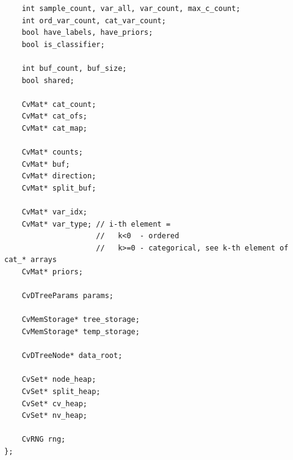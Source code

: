\begin{lstlisting}
    int sample_count, var_all, var_count, max_c_count;
    int ord_var_count, cat_var_count;
    bool have_labels, have_priors;
    bool is_classifier;

    int buf_count, buf_size;
    bool shared;

    CvMat* cat_count;
    CvMat* cat_ofs;
    CvMat* cat_map;

    CvMat* counts;
    CvMat* buf;
    CvMat* direction;
    CvMat* split_buf;

    CvMat* var_idx;
    CvMat* var_type; // i-th element =
                     //   k<0  - ordered
                     //   k>=0 - categorical, see k-th element of cat_* arrays
    CvMat* priors;

    CvDTreeParams params;

    CvMemStorage* tree_storage;
    CvMemStorage* temp_storage;

    CvDTreeNode* data_root;

    CvSet* node_heap;
    CvSet* split_heap;
    CvSet* cv_heap;
    CvSet* nv_heap;

    CvRNG rng;
};
\end{lstlisting}


